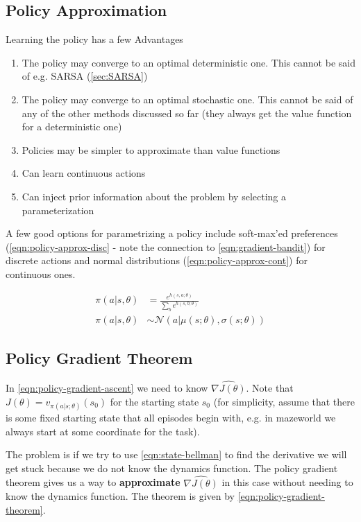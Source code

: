 \documentclass[11pt]{report}
\begin{document}
\subsection{Policy Approximation}
Learning the policy has a few Advantages
\begin{enumerate}
	\item The policy may converge to an optimal deterministic one. This cannot be said of e.g. SARSA (\autoref{sec:SARSA})
	\item The policy may converge to an optimal stochastic one. This cannot be said of any of the other methods discussed so far (they always get the value function for a deterministic one)
	\item Policies may be simpler to approximate than value functions
	\item Can learn continuous actions
	\item Can inject prior information about the problem by selecting a parameterization
\end{enumerate}

A few good options for parametrizing a policy include soft-max'ed preferences (\autoref{eqn:policy-approx-disc} - note the connection to \autoref{eqn:gradient-bandit}) for discrete actions and normal distributions (\autoref{eqn:policy-approx-cont}) for continuous ones.

\begin{align}
	\label{eqn:policy-approx-disc}
	\pi(a | s, \theta) &= \frac{e^{h(s, a; \theta)}}{\sum_b e^{h(s, b; \theta)}}\\
	\label{eqn:policy-approx-cont}
	\pi(a | s, \theta) &\sim \mathcal{N}(a | \mu(s; \theta), \sigma(s; \theta))
\end{align}

\subsection{Policy Gradient Theorem}\label{sec:policy-gradient-theorem}
In \autoref{eqn:policy-gradient-ascent} we need to know $\widehat{\nabla J(\theta)}$. Note that $J(\theta) = v_{\pi(a|s;\theta)}(s_0)$ for the starting state $s_0$ (for simplicity, assume that there is some fixed starting state that all episodes begin with, e.g. in mazeworld we always start at some coordinate for the task).

The problem is if we try to use \autoref{eqn:state-bellman} to find the derivative we will get stuck because we do not know the dynamics function. The policy gradient theorem gives us a way to \textbf{approximate} $\widehat{\nabla{J(\theta)}}$ in this case without needing to know the dynamics function. The theorem is given by \autoref{eqn:policy-gradient-theorem}.
\end{document}
